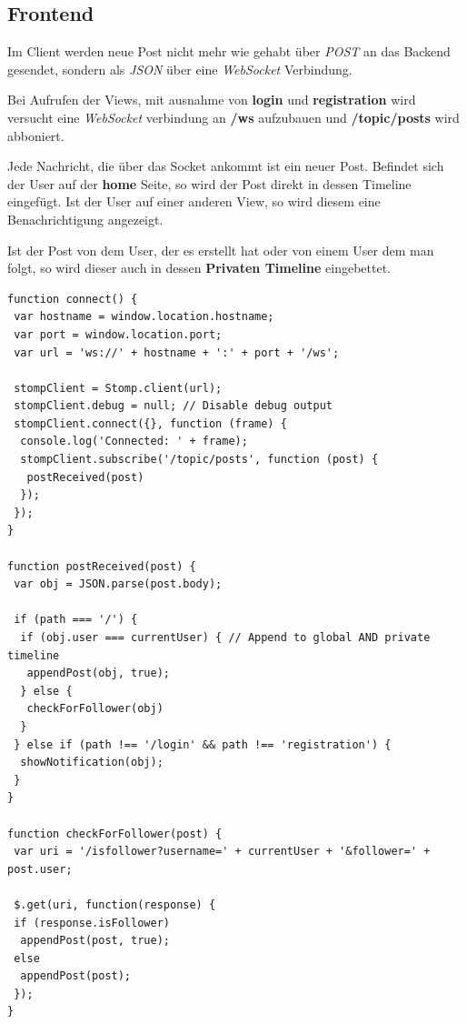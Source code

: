 \documentclass[
    a4paper
]{scrreprt}
\begin{document}
	\subsection{Frontend}
	Im Client werden neue Post nicht mehr wie gehabt über \textit{POST} an das Backend gesendet, sondern als \textit{JSON} über eine \textit{WebSocket} Verbindung.
	
	Bei Aufrufen der Views, mit ausnahme von \textbf{login} und \textbf{registration} wird versucht eine \textit{WebSocket} verbindung an \textbf{/ws} aufzubauen und \textbf{/topic/posts} wird abboniert. 
	
	Jede Nachricht, die über das Socket ankommt ist ein neuer Post. 
	Befindet sich der User auf der \textbf{home} Seite, so wird der Post direkt in dessen Timeline eingefügt. Ist der User auf einer anderen View, so wird diesem eine Benachrichtigung angezeigt.
	
	Ist der Post von dem User, der es erstellt hat oder von einem User dem man folgt, so wird dieser auch in dessen \textbf{Privaten Timeline} eingebettet. 
	
	\begin{lstlisting}
function connect() {
 var hostname = window.location.hostname; 
 var port = window.location.port;
 var url = 'ws://' + hostname + ':' + port + '/ws';

 stompClient = Stomp.client(url);
 stompClient.debug = null; // Disable debug output
 stompClient.connect({}, function (frame) {
  console.log('Connected: ' + frame);
  stompClient.subscribe('/topic/posts', function (post) {
   postReceived(post)
  });
 });
}

function postReceived(post) {
 var obj = JSON.parse(post.body);

 if (path === '/') {
  if (obj.user === currentUser) { // Append to global AND private timeline
   appendPost(obj, true);
  } else {
   checkForFollower(obj)
  }
 } else if (path !== '/login' && path !== 'registration') {
  showNotification(obj);
 }
}

function checkForFollower(post) {
 var uri = '/isfollower?username=' + currentUser + '&follower=' + post.user;

 $.get(uri, function(response) {
 if (response.isFollower)
  appendPost(post, true);
 else
  appendPost(post);
 });
}
	\end{lstlisting}
 	
\end{document}
